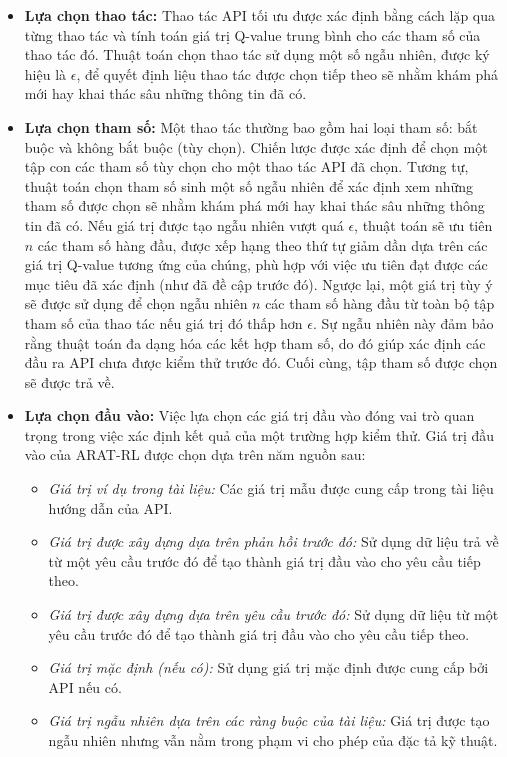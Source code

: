 \begin{itemize}
    \item \textbf{Lựa chọn thao tác: }Thao tác API tối ưu được xác định bằng cách lặp qua từng thao tác và tính toán giá trị Q-value trung bình cho các tham số của thao tác đó. Thuật toán chọn thao tác sử dụng một số ngẫu nhiên, được ký hiệu là $\epsilon$, để quyết định liệu thao tác được chọn tiếp theo sẽ nhằm khám phá mới hay khai thác sâu những thông tin đã có.
    \item \textbf{Lựa chọn tham số: }Một thao tác thường bao gồm hai loại tham số: bắt buộc và không bắt buộc (tùy chọn). Chiến lược được xác định để chọn một tập con các tham số tùy chọn cho một thao tác API đã chọn. Tương tự, thuật toán chọn tham số sinh một số ngẫu nhiên để xác định xem những tham số được chọn sẽ nhằm khám phá mới hay khai thác sâu những thông tin đã có. Nếu giá trị được tạo ngẫu nhiên vượt quá $\epsilon$, thuật toán sẽ ưu tiên $n$ các tham số  hàng đầu, được xếp hạng theo thứ tự giảm dần dựa trên các giá trị Q-value tương ứng của chúng, phù hợp với việc ưu tiên đạt được các mục tiêu đã xác định (như đã đề cập trước đó). Ngược lại, một giá trị tùy ý sẽ được sử dụng để chọn ngẫu nhiên $n$ các tham số hàng đầu từ toàn bộ tập tham số của thao tác nếu giá trị đó thấp hơn $\epsilon$. Sự ngẫu nhiên này đảm bảo rằng thuật toán đa dạng hóa các kết hợp tham số, do đó giúp xác định các đầu ra API chưa được kiểm thử trước đó. Cuối cùng, tập tham số được chọn sẽ được trả về.
    \item \textbf{Lựa chọn đầu vào: } Việc lựa chọn các giá trị đầu vào đóng vai trò quan trọng trong việc xác định kết quả của một trường hợp kiểm thử. Giá trị đầu vào của ARAT-RL được chọn dựa trên năm nguồn sau:
    \begin{itemize}
\item \textit{Giá trị ví dụ trong tài liệu:} Các giá trị mẫu được cung cấp trong tài liệu hướng dẫn của API.
    \item \textit{Giá trị được xây dựng dựa trên phản hồi trước đó:} Sử dụng dữ liệu trả về từ một yêu cầu trước đó để tạo thành giá trị đầu vào cho yêu cầu tiếp theo.
    \item \textit{Giá trị được xây dựng dựa trên yêu cầu trước đó:} Sử dụng dữ liệu từ một yêu cầu trước đó để tạo thành giá trị đầu vào cho yêu cầu tiếp theo.
    \item \textit{Giá trị mặc định (nếu có):} Sử dụng giá trị mặc định được cung cấp bởi API nếu có.
    \item \textit{Giá trị ngẫu nhiên dựa trên các ràng buộc của tài liệu:} Giá trị được tạo ngẫu nhiên nhưng vẫn nằm trong phạm vi cho phép của đặc tả kỹ thuật.
\end{itemize}


\end{itemize}









